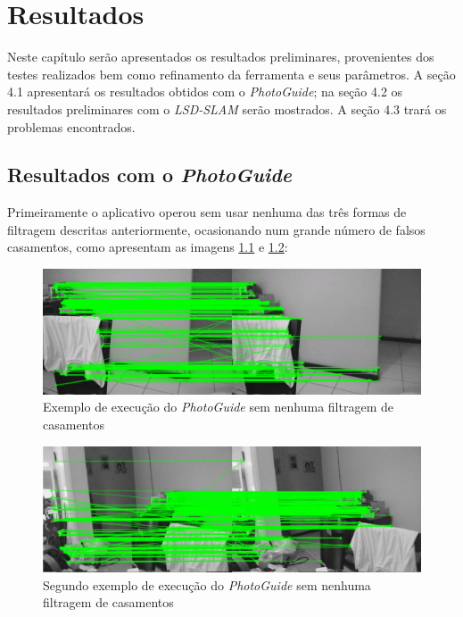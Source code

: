\chapter{Resultados}

Neste capítulo serão apresentados os resultados preliminares, provenientes dos testes realizados bem como refinamento da ferramenta e seus parâmetros. A seção 4.1 apresentará os resultados obtidos com o \textit{PhotoGuide}; na seção 4.2 os resultados preliminares com o \textit{LSD-SLAM} serão mostrados. A seção 4.3 trará os problemas encontrados.

\section{Resultados com o \textit{PhotoGuide}}

Primeiramente o aplicativo operou sem usar nenhuma das três formas de filtragem descritas anteriormente, ocasionando num grande número de falsos casamentos, como apresentam as imagens \ref{fig4:1} e \ref{fig4:2}:

\begin{figure}[H]
	\centering
		\includegraphics[width= \textwidth]{Imagens/figura4-1.png}
	\caption{Exemplo de execução do \textit{PhotoGuide} sem nenhuma filtragem de casamentos}
	\label{fig4:1}
\end{figure}

\begin{figure}[H]
	\centering
		\includegraphics[width= \textwidth]{Imagens/figura4-2.png}
	\caption{Segundo exemplo de execução do \textit{PhotoGuide} sem nenhuma filtragem de casamentos}
	\label{fig4:2}
\end{figure}

